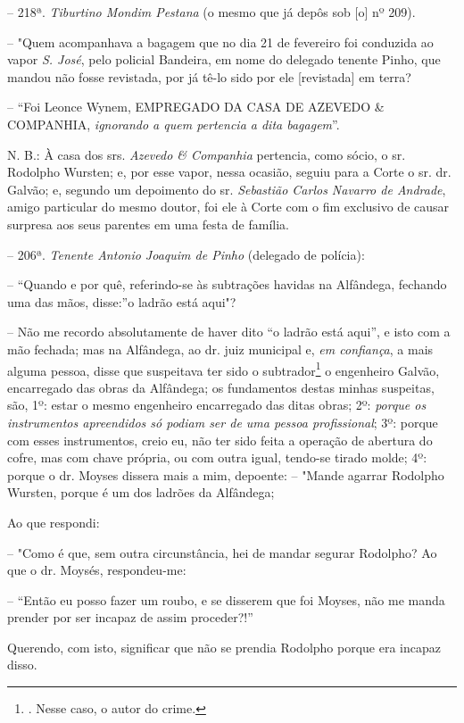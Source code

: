 -- 218ª. \emph{Tiburtino Mondim Pestana} (o mesmo que já depôs sob
{[}o{]} nº 209).

-- "Quem acompanhava a bagagem que no dia 21 de fevereiro foi conduzida
ao vapor \emph{S. José}, pelo policial Bandeira, em nome do delegado
tenente Pinho, que mandou não fosse revistada, por já tê-lo sido por ele
{[}revistada{]} em terra?

-- ``Foi Leonce Wynem, EMPREGADO DA CASA DE AZEVEDO \& COMPANHIA,
\emph{ignorando a quem pertencia a dita bagagem}''.

N. B.: À casa dos srs. \emph{Azevedo \& Companhia} pertencia, como
sócio, o sr. Rodolpho Wursten; e, por esse vapor, nessa ocasião, seguiu
para a Corte o sr. dr. Galvão; e, segundo um depoimento do sr.
\emph{Sebastião Carlos Navarro de Andrade}, amigo particular do mesmo
doutor, foi ele à Corte com o fim exclusivo de causar surpresa aos seus
parentes em uma festa de família.

-- 206ª. \emph{Tenente Antonio Joaquim de Pinho} (delegado de polícia):

-- ``Quando e por quê, referindo-se às subtrações havidas na Alfândega,
fechando uma das mãos, disse:''o ladrão está aqui"?

-- Não me recordo absolutamente de haver dito ``o ladrão está aqui'', e
isto com a mão fechada; mas na Alfândega, ao dr. juiz municipal e,
\emph{em confiança}, a mais alguma pessoa, disse que suspeitava ter sido
o subtrador\footnote{. Nesse caso, o autor do crime.} o engenheiro
Galvão, encarregado das obras da Alfândega; os fundamentos destas minhas
suspeitas, são, 1º: estar o mesmo engenheiro encarregado das ditas
obras; 2º: \emph{porque os instrumentos apreendidos só podiam ser de uma
pessoa profissional}; 3º: porque com esses instrumentos, creio eu, não
ter sido feita a operação de abertura do cofre, mas com chave própria,
ou com outra igual, tendo-se tirado molde; 4º: porque o dr. Moyses
dissera mais a mim, depoente: -- "Mande agarrar Rodolpho Wursten, porque
é um dos ladrões da Alfândega;

Ao que respondi:

-- "Como é que, sem outra circunstância, hei de mandar segurar Rodolpho?
Ao que o dr. Moysés, respondeu-me:

-- ``Então eu posso fazer um roubo, e se disserem que foi Moyses, não me
manda prender por ser incapaz de assim proceder?!''

Querendo, com isto, significar que não se prendia Rodolpho porque era
incapaz disso.

